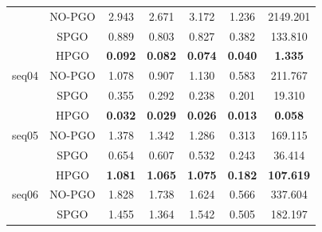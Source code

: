 \documentclass[letterpaper, 10 pt, conference]{ieeeconf}  %
\begin{document}
\begin{table}[h]
{\begin{tabular}{|c|c|ccccc|}
                         & NO-PGO                  & \multicolumn{1}{c|}{2.943}          & \multicolumn{1}{c|}{2.671}          & \multicolumn{1}{c|}{3.172}          & \multicolumn{1}{c|}{1.236}          & 2149.201         \\ \cline{2-7} 
                         & SPGO                    & \multicolumn{1}{c|}{0.889}          & \multicolumn{1}{c|}{0.803}          & \multicolumn{1}{c|}{0.827}          & \multicolumn{1}{c|}{0.382}          & 133.810          \\ \hline\hline
\multirow{3}{*}{seq04}   & HPGO                    & \multicolumn{1}{c|}{\textbf{0.092}} & \multicolumn{1}{c|}{\textbf{0.082}} & \multicolumn{1}{c|}{\textbf{0.074}} & \multicolumn{1}{c|}{\textbf{0.040}} & \textbf{1.335}   \\ \cline{2-7} 
                         & NO-PGO                  & \multicolumn{1}{c|}{1.078}          & \multicolumn{1}{c|}{0.907}          & \multicolumn{1}{c|}{1.130}          & \multicolumn{1}{c|}{0.583}          & 211.767          \\ \cline{2-7} 
                         & SPGO                    & \multicolumn{1}{c|}{0.355}          & \multicolumn{1}{c|}{0.292}          & \multicolumn{1}{c|}{0.238}          & \multicolumn{1}{c|}{0.201}          & 19.310           \\ \hline\hline
\multirow{3}{*}{seq05}   & HPGO                    & \multicolumn{1}{c|}{\textbf{0.032}} & \multicolumn{1}{c|}{\textbf{0.029}} & \multicolumn{1}{c|}{\textbf{0.026}} & \multicolumn{1}{c|}{\textbf{0.013}} & \textbf{0.058}   \\ \cline{2-7} 
                         & NO-PGO                  & \multicolumn{1}{c|}{1.378}          & \multicolumn{1}{c|}{1.342}          & \multicolumn{1}{c|}{1.286}          & \multicolumn{1}{c|}{0.313}          & 169.115          \\ \cline{2-7} 
                         & SPGO                    & \multicolumn{1}{c|}{0.654}          & \multicolumn{1}{c|}{0.607}          & \multicolumn{1}{c|}{0.532}          & \multicolumn{1}{c|}{0.243}          & 36.414           \\ \hline\hline
\multirow{3}{*}{seq06}   & HPGO                    & \multicolumn{1}{c|}{\textbf{1.081}} & \multicolumn{1}{c|}{\textbf{1.065}} & \multicolumn{1}{c|}{\textbf{1.075}} & \multicolumn{1}{c|}{\textbf{0.182}} & \textbf{107.619} \\ \cline{2-7} 
                         & NO-PGO                  & \multicolumn{1}{c|}{1.828}          & \multicolumn{1}{c|}{1.738}          & \multicolumn{1}{c|}{1.624}          & \multicolumn{1}{c|}{0.566}          & 337.604          \\ \cline{2-7} 
                         & SPGO                    & \multicolumn{1}{c|}{1.455}          & \multicolumn{1}{c|}{1.364}          & \multicolumn{1}{c|}{1.542}          & \multicolumn{1}{c|}{0.505}          & 182.197          \\ \hline
\end{tabular}
}
\label{table:ateWithGT}
\end{table}
\end{document}
